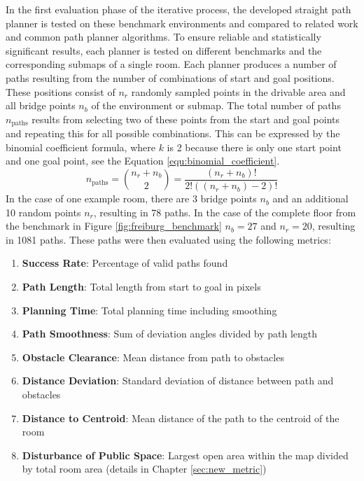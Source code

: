In the first evaluation phase of the iterative process, the developed straight path planner is tested on these benchmark environments and compared to related work and common path planner algorithms. To ensure reliable and statistically significant results, each planner is tested on different benchmarks and the corresponding submaps of a single room. Each planner produces a number of paths resulting from the number of combinations of start and goal positions. These positions consist of \(n_r\) randomly sampled points in the drivable area and all bridge points \(n_b\) of the environment or submap. The total number of paths \(n_{\text{paths}}\) results from selecting two of these points from the start and goal points and repeating this for all possible combinations. This can be expressed by the binomial coefficient formula, where \(k\) is 2 because there is only one start point and one goal point, see the Equation \ref{equ:binomial_coefficient}.
\begin{equation} \label{equ:binomial_coefficient}
    n_{\text{paths}} = \binom{n_r + n_b}{2} = \frac{(n_r + n_b)!}{2! ((n_r + n_b)-2)!}
\end{equation}
In the case of one example room, there are 3 bridge points \(n_b\) and an additional 10 random points \(n_r\), resulting in 78 paths. In the case of the complete floor from the benchmark in Figure \ref{fig:freiburg_benchmark} \(n_b = 27\) and \(n_r = 20\), resulting in 1081 paths. These paths were then evaluated using the following metrics:
\begin{enumerate}
    \item \textbf{Success Rate}: Percentage of valid paths found
    \item \textbf{Path Length}: Total length from start to goal in pixels
    \item \textbf{Planning Time}: Total planning time including smoothing
    \item \textbf{Path Smoothness}: Sum of deviation angles divided by path length
    \item \textbf{Obstacle Clearance}: Mean distance from path to obstacles
    \item \textbf{Distance Deviation}: Standard deviation of distance between path and obstacles
    \item \textbf{Distance to Centroid}: Mean distance of the path to the centroid of the room
    \item \textbf{Disturbance of Public Space}: Largest open area within the map divided by total room area (details in Chapter \ref{sec:new_metric})
\end{enumerate}

